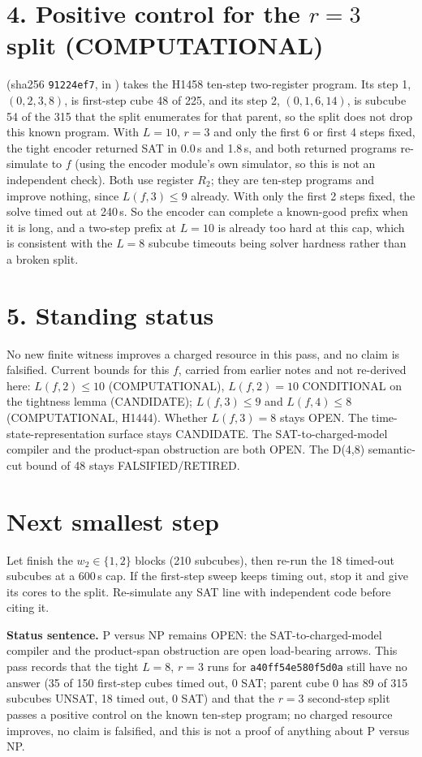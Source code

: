 \documentclass[11pt]{article}
\begin{document}
\section*{4. Positive control for the $r=3$ split (COMPUTATIONAL)}
 (sha256 \texttt{91224ef7}, in ) takes the H1458 ten-step two-register program. Its step 1, $(0,2,3,8)$, is first-step cube 48 of 225, and its step 2, $(0,1,6,14)$, is subcube 54 of the 315 that the split enumerates for that parent, so the split does not drop this known program. With $L=10$, $r=3$ and only the first 6 or first 4 steps fixed, the tight encoder returned SAT in 0.0\,s and 1.8\,s, and both returned programs re-simulate to $f$ (using the encoder module's own simulator, so this is not an independent check). Both use register $R_2$; they are ten-step programs and improve nothing, since $L(f,3)\le 9$ already. With only the first 2 steps fixed, the solve timed out at 240\,s. So the encoder can complete a known-good prefix when it is long, and a two-step prefix at $L=10$ is already too hard at this cap, which is consistent with the $L=8$ subcube timeouts being solver hardness rather than a broken split.

\section*{5. Standing status}
No new finite witness improves a charged resource in this pass, and no claim is falsified. Current bounds for this $f$, carried from earlier notes and not re-derived here: $L(f,2)\le 10$ (COMPUTATIONAL), $L(f,2)=10$ CONDITIONAL on the tightness lemma (CANDIDATE); $L(f,3)\le 9$ and $L(f,4)\le 8$ (COMPUTATIONAL, H1444). Whether $L(f,3)=8$ stays OPEN. The time-state-representation surface stays CANDIDATE. The SAT-to-charged-model compiler and the product-span obstruction are both OPEN. The D(4,8) semantic-cut bound of 48 stays FALSIFIED/RETIRED.

\section*{Next smallest step}
Let  finish the $w_2\in\{1,2\}$ blocks (210 subcubes), then re-run the 18 timed-out subcubes at a 600\,s cap. If the first-step sweep keeps timing out, stop it and give its cores to the split. Re-simulate any SAT line with independent code before citing it.

\bigskip
\noindent\textbf{Status sentence.} P versus NP remains OPEN: the SAT-to-charged-model compiler and the product-span obstruction are open load-bearing arrows. This pass records that the tight $L=8$, $r=3$ runs for \texttt{a40ff54e580f5d0a} still have no answer (35 of 150 first-step cubes timed out, 0 SAT; parent cube 0 has 89 of 315 subcubes UNSAT, 18 timed out, 0 SAT) and that the $r=3$ second-step split passes a positive control on the known ten-step program; no charged resource improves, no claim is falsified, and this is not a proof of anything about P versus NP.
\end{document}
